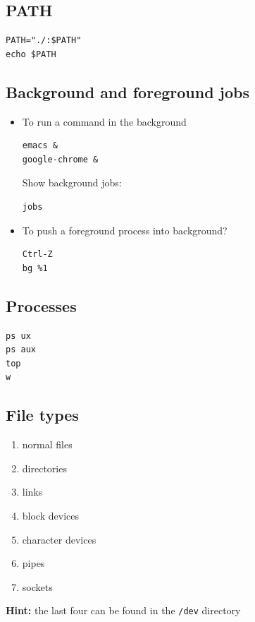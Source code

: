 \documentclass[12pt]{article}
\begin{document}
\subsection{PATH}
\label{sec-2-3}
\begin{verbatim}
PATH="./:$PATH"
echo $PATH
\end{verbatim}

\subsection{Background and foreground jobs}
\label{sec-2-4}
\begin{itemize}
\item To run a command in the background
\begin{verbatim}
emacs &
google-chrome &
\end{verbatim}
Show background jobs:
\begin{verbatim}
jobs
\end{verbatim}
\item To push a foreground process into background?
\begin{verbatim}
Ctrl-Z
bg %1
\end{verbatim}
\end{itemize}
\subsection{Processes}
\label{sec-2-5}
\begin{verbatim}
ps ux
ps aux
top
w
\end{verbatim}
\subsection{File types}
\label{sec-2-6}
\begin{enumerate}
\item normal files
\item directories
\item links
\item block devices
\item character devices
\item pipes
\item sockets
\end{enumerate}

\textbf{Hint:} the last four can be found in the \texttt{/dev} directory
\end{document}
